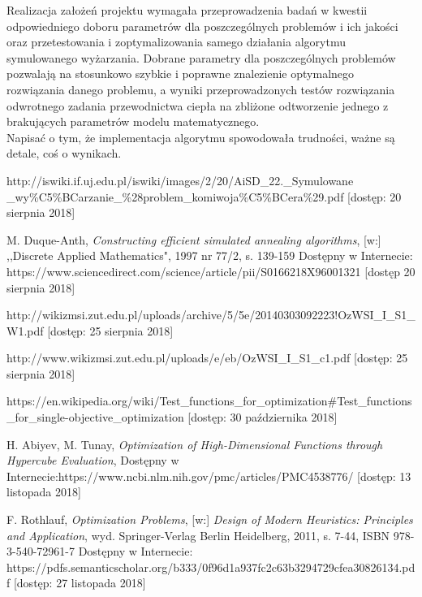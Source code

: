 \documentclass[twoside]{projektInzynierskiMS1}
\newcommand{\si}{ś}
\begin{document}
Realizacja założeń projektu wymagała przeprowadzenia badań w kwestii odpowiedniego doboru parametrów dla poszczególnych problemów i ich jako\si ci oraz przetestowania i zoptymalizowania samego działania algorytmu symulowanego wyżarzania. Dobrane parametry dla poszczególnych problemów pozwalają na stosunkowo szybkie i poprawne znalezienie optymalnego rozwiązania danego problemu, a wyniki przeprowadzonych testów rozwiązania odwrotnego zadania przewodnictwa ciepła na zbliżone odtworzenie jednego z brakujących parametrów modelu matematycznego. \\

%
Napisać o tym, że implementacja algorytmu spowodowała trudno\si ci, ważne są detale, coś o wynikach.
%

\begin{thebibliography}{12}

 http://iswiki.if.uj.edu.pl/iswiki/images/2/20/AiSD\_22.\_Symulowane \_wy\%C5\%BCarzanie\_\%28problem\_komiwoja\%C5\%BCera\%29.pdf [dostęp: 20 sierpnia 2018]

 M. Duque-Anth, \textit{Constructing efficient simulated annealing algorithms}, [w:] ,,Discrete Applied Mathematics", 1997 nr 77/2, s. 139-159 Dostępny w Internecie: https://www.sciencedirect.com/science/article/pii/S0166218X96001321
[dostęp 20 sierpnia 2018]

 http://wikizmsi.zut.edu.pl/uploads/archive/5/5e/20140303092223!OzWSI\_I\_S1\_W1.pdf
[dostęp: 25 sierpnia 2018]

 http://www.wikizmsi.zut.edu.pl/uploads/e/eb/OzWSI\_I\_S1\_c1.pdf
[dostęp: 25 sierpnia 2018]

 https://en.wikipedia.org/wiki/Test\_functions\_for\_optimization\#Test\_functions\_for\_single-objective\_optimization [dostęp: 30 października 2018]

 H. Abiyev, M. Tunay, \textit{Optimization of High-Dimensional Functions through Hypercube Evaluation}, Dostępny w Internecie:https://www.ncbi.nlm.nih.gov/pmc/articles/PMC4538776/
[dostęp: 13 listopada 2018]


 F. Rothlauf, \textit{Optimization Problems}, [w:] \textit{Design of Modern Heuristics: Principles and Application}, wyd. Springer-Verlag Berlin Heidelberg, 2011, s. 7-44, ISBN 978-3-540-72961-7
Dostępny w Internecie: https://pdfs.semanticscholar.org/b333/0f96d1a937fc2c63b3294729cfea30826134.pdf
[dostęp: 27 listopada 2018]


\end{thebibliography}
\end{document}
